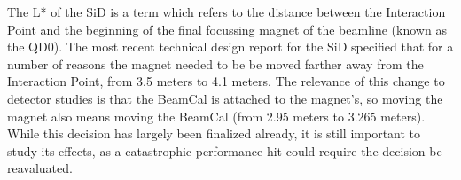 \documentclass{report}
\begin{document}
                The L* of the SiD is a term which refers to the distance between the Interaction Point and the beginning of the final focussing magnet of the beamline (known as the QD0). The most recent technical design report for the SiD specified that for a number of reasons the magnet needed to be be moved farther away from the Interaction Point, from 3.5 meters to 4.1 meters. The relevance of this change to detector studies is that the BeamCal is attached to the magnet's, so moving the magnet also means moving the BeamCal (from 2.95 meters to 3.265 meters). While this decision has largely been finalized already, it is still important to study its effects, as a catastrophic performance hit could require the decision be reavaluated.
                

\end{document}
